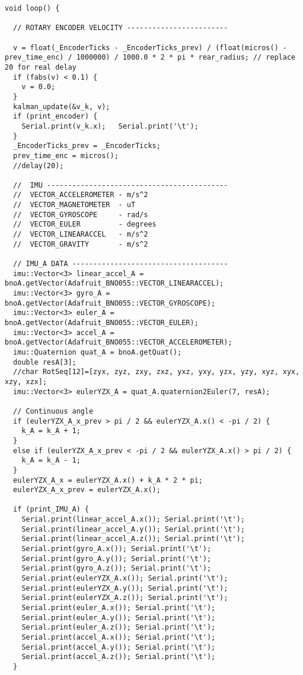 \begin{lstlisting}[style=codearduino]
void loop() {

  // ROTARY ENCODER VELOCITY ------------------------

  v = float(_EncoderTicks - _EncoderTicks_prev) / (float(micros() - prev_time_enc) / 1000000) / 1000.0 * 2 * pi * rear_radius; // replace 20 for real delay
  if (fabs(v) < 0.1) {
    v = 0.0;
  }
  kalman_update(&v_k, v);
  if (print_encoder) {
    Serial.print(v_k.x);   Serial.print('\t');
  }
  _EncoderTicks_prev = _EncoderTicks;
  prev_time_enc = micros();
  //delay(20);

  //  IMU -------------------------------------------
  //  VECTOR_ACCELEROMETER - m/s^2
  //  VECTOR_MAGNETOMETER  - uT
  //  VECTOR_GYROSCOPE     - rad/s
  //  VECTOR_EULER         - degrees
  //  VECTOR_LINEARACCEL   - m/s^2
  //  VECTOR_GRAVITY       - m/s^2

  // IMU_A DATA -------------------------------------
  imu::Vector<3> linear_accel_A = bnoA.getVector(Adafruit_BNO055::VECTOR_LINEARACCEL);
  imu::Vector<3> gyro_A = bnoA.getVector(Adafruit_BNO055::VECTOR_GYROSCOPE);
  imu::Vector<3> euler_A = bnoA.getVector(Adafruit_BNO055::VECTOR_EULER);
  imu::Vector<3> accel_A = bnoA.getVector(Adafruit_BNO055::VECTOR_ACCELEROMETER);
  imu::Quaternion quat_A = bnoA.getQuat();
  double resA[3];
  //char RotSeq[12]=[zyx, zyz, zxy, zxz, yxz, yxy, yzx, yzy, xyz, xyx, xzy, xzx];
  imu::Vector<3> eulerYZX_A = quat_A.quaternion2Euler(7, resA);

  // Continuous angle
  if (eulerYZX_A_x_prev > pi / 2 && eulerYZX_A.x() < -pi / 2) {
    k_A = k_A + 1;
  }
  else if (eulerYZX_A_x_prev < -pi / 2 && eulerYZX_A.x() > pi / 2) {
    k_A = k_A - 1;
  }
  eulerYZX_A_x = eulerYZX_A.x() + k_A * 2 * pi;
  eulerYZX_A_x_prev = eulerYZX_A.x();

  if (print_IMU_A) {
    Serial.print(linear_accel_A.x()); Serial.print('\t');
    Serial.print(linear_accel_A.y()); Serial.print('\t');
    Serial.print(linear_accel_A.z()); Serial.print('\t');
    Serial.print(gyro_A.x()); Serial.print('\t');
    Serial.print(gyro_A.y()); Serial.print('\t');
    Serial.print(gyro_A.z()); Serial.print('\t');
    Serial.print(eulerYZX_A.x()); Serial.print('\t');
    Serial.print(eulerYZX_A.y()); Serial.print('\t');
    Serial.print(eulerYZX_A.z()); Serial.print('\t');
    Serial.print(euler_A.x()); Serial.print('\t');
    Serial.print(euler_A.y()); Serial.print('\t');
    Serial.print(euler_A.z()); Serial.print('\t');
    Serial.print(accel_A.x()); Serial.print('\t');
    Serial.print(accel_A.y()); Serial.print('\t');
    Serial.print(accel_A.z()); Serial.print('\t');
  }


\end{lstlisting}
